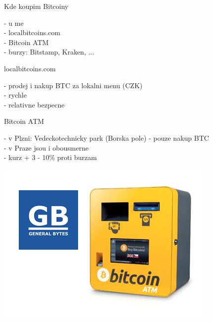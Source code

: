 \documentclass{beamer}
\begin{document}
\begin{frame}

    {\LARGE Kde koupim Bitcoiny}\\

    \vspace{5mm}

    - u me\\
    - localbitcoins.com\\
    - Bitcoin ATM\\
    - burzy: Bitstamp, Kraken, ...\\

\end{frame}

\begin{frame}

    {\LARGE localbitcoins.com}\\

    \vspace{5mm}

    - prodej i nakup BTC za lokalni menu (CZK)\\
    - rychle\\
    - relativne bezpecne\\

\end{frame}

\begin{frame}

    {\LARGE Bitcoin ATM}\\

    \vspace{5mm}

    - v Plzni: Vedeckotechnicky park (Borska pole) - pouze nakup BTC\\
    - v Praze jsou i obousmerne\\
    - kurz + 3 - 10\% proti burzam\\

    \vspace{5mm}

    \includegraphics[scale=0.4]{img/atm}

\end{frame}
\end{document}
